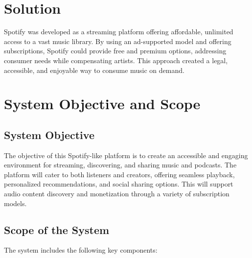 \documentclass[a4paper,10pt]{article}
\begin{document}
\section{Solution}
Spotify was developed as a streaming platform offering affordable, unlimited access to a vast music library. By using an ad-supported model and offering subscriptions, Spotify could provide free and premium options, addressing consumer needs while compensating artists. This approach created a legal, accessible, and enjoyable way to consume music on demand.

\section{System Objective and Scope}

\subsection{System Objective}
The objective of this Spotify-like platform is to create an accessible and engaging environment for streaming, discovering, and sharing music and podcasts. The platform will cater to both listeners and creators, offering seamless playback, personalized recommendations, and social sharing options. This will support audio content discovery and monetization through a variety of subscription models.

\subsection{Scope of the System}

The system includes the following key components:
\end{document}
